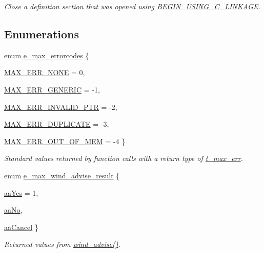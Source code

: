\begin{DoxyCompactItemize}
\begin{DoxyCompactList}\small\item\em Close a definition section that was opened using \hyperlink{group__misc_ga06f35de4fc025809ab1cbb06f55b6495}{BEGIN\_\-USING\_\-C\_\-LINKAGE}. \item\end{DoxyCompactList}\end{DoxyCompactItemize}
\subsection*{Enumerations}
\begin{DoxyCompactItemize}
\item 
enum \hyperlink{group__misc_ga0764dd6c02b76cca7d053ae50555d69d}{e\_\-max\_\-errorcodes} \{ \par
\hyperlink{group__misc_gga0764dd6c02b76cca7d053ae50555d69da6d22f77fef8b1e1b074cef5d29d935fd}{MAX\_\-ERR\_\-NONE} =  0, 
\par
\hyperlink{group__misc_gga0764dd6c02b76cca7d053ae50555d69dae285bdd436f17560cfd09c6b31ea397d}{MAX\_\-ERR\_\-GENERIC} =  -\/1, 
\par
\hyperlink{group__misc_gga0764dd6c02b76cca7d053ae50555d69da42a29c15166206a1bbc13bcc74b2c651}{MAX\_\-ERR\_\-INVALID\_\-PTR} =  -\/2, 
\par
\hyperlink{group__misc_gga0764dd6c02b76cca7d053ae50555d69da9b67faa1ffafc9b60748135e48b105d1}{MAX\_\-ERR\_\-DUPLICATE} =  -\/3, 
\par
\hyperlink{group__misc_gga0764dd6c02b76cca7d053ae50555d69da5415d3c3fa523e0bb2ed1edfdbfce9be}{MAX\_\-ERR\_\-OUT\_\-OF\_\-MEM} =  -\/4
 \}
\begin{DoxyCompactList}\small\item\em Standard values returned by function calls with a return type of \hyperlink{group__datatypes_ga73edaae82b318855cc09fac994918165}{t\_\-max\_\-err}. \item\end{DoxyCompactList}\item 
enum \hyperlink{group__misc_ga4cf665eb75774ae52451e04f91747c25}{e\_\-max\_\-wind\_\-advise\_\-result} \{ \par
\hyperlink{group__misc_gga4cf665eb75774ae52451e04f91747c25a9d84de609dac254d18b580c1aeb3fd32}{aaYes} =  1, 
\par
\hyperlink{group__misc_gga4cf665eb75774ae52451e04f91747c25a614519005d5ef9267c6f73891ea11e56}{aaNo}, 
\par
\hyperlink{group__misc_gga4cf665eb75774ae52451e04f91747c25a2d8f037a3e3227d4bc488ff6b9050833}{aaCancel}
 \}
\begin{DoxyCompactList}\small\item\em Returned values from \hyperlink{group__misc_gab127ce8d89ae72d420a44642c52cc94d}{wind\_\-advise()}. \item\end{DoxyCompactList}\end{DoxyCompactItemize}

